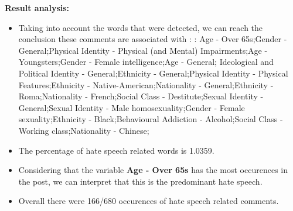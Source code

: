 \documentclass[11pt]{article}
\begin{document}
\textbf{\Large Result analysis:}

\begin{itemize}\item Taking into account the words that were detected, we can reach the conclusion these comments are associated with : : Age - Over 65s;Gender - General;Physical Identity - Physical (and Mental) Impairments;Age - Youngsters;Gender - Female intelligence;Age - General; Ideological and Political Identity - General;Ethnicity - General;Physical Identity - Physical Features;Ethnicity - Native-American;Nationality - General;Ethnicity - Roma;Nationality - French;Social Class - Destitute;Sexual Identity - General;Sexual Identity - Male homosexuality;Gender - Female sexuality;Ethnicity - Black;Behavioural Addiction - Alcohol;Social Class - Working class;Nationality - Chinese;%

\item The percentage of hate speech related words is 1.0359.

\item Considering that the variable \textbf{Age - Over 65s} has the most occurences in the post, we can interpret that this is the predominant hate speech.

\item Overall there were 166/680 occurences of hate speech related comments.\end{itemize}
\end{document}
